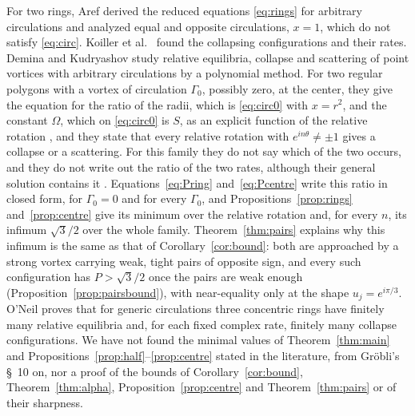\documentclass[11pt]{article}
\theoremstyle{definition}
\begin{document}
For two rings, Aref \cite{aref1982} derived the reduced equations \eqref{eq:rings} for arbitrary circulations and analyzed equal and opposite circulations, $x = 1$, which do not satisfy \eqref{eq:circ}. Koiller et al.\ \cite{koiller1985} found the collapsing configurations and their rates. Demina and Kudryashov \cite{dk2014} study relative equilibria, collapse and scattering of point vortices with arbitrary circulations by a polynomial method. For two regular polygons with a vortex of circulation $\Gamma_0$, possibly zero, at the center, they give the equation for the ratio of the radii, which is \eqref{eq:circ0} with $x = r^2$, and the constant $\Omega$, which on \eqref{eq:circ0} is $S$, as an explicit function of the relative rotation \cite[Eqs.~(36)--(37)]{dk2014}, and they state that every relative rotation with $e^{in\theta} \neq \pm 1$ gives a collapse or a scattering. For this family they do not say which of the two occurs, and they do not write out the ratio of the two rates, although their general solution contains it \cite[Eq.~(10)]{dk2014}. Equations~\eqref{eq:Pring} and~\eqref{eq:Pcentre} write this ratio in closed form, for $\Gamma_0 = 0$ and for every $\Gamma_0$, and Propositions~\ref{prop:rings} and~\ref{prop:centre} give its minimum over the relative rotation and, for every $n$, its infimum $\sqrt{3}/2$ over the whole family. Theorem~\ref{thm:pairs} explains why this infimum is the same as that of Corollary~\ref{cor:bound}: both are approached by a strong vortex carrying weak, tight pairs of opposite sign, and every such configuration has $P > \sqrt{3}/2$ once the pairs are weak enough (Proposition~\ref{prop:pairsbound}), with near-equality only at the shape $u_j = e^{i\pi/3}$. O'Neil \cite{oneil2007} proves that for generic circulations three concentric rings have finitely many relative equilibria and, for each fixed complex rate, finitely many collapse configurations. We have not found the minimal values of Theorem~\ref{thm:main} and Propositions~\ref{prop:half}--\ref{prop:centre} stated in the literature, from Gr\"obli's \S~10 \cite{grobli1877} on, nor a proof of the bounds of Corollary~\ref{cor:bound}, Theorem~\ref{thm:alpha}, Proposition~\ref{prop:centre} and Theorem~\ref{thm:pairs} or of their sharpness.
\end{document}
